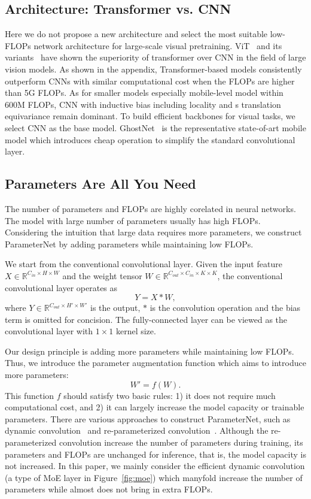 \documentclass[10pt,twocolumn,letterpaper]{article}
\begin{document}
\subsection{Architecture: Transformer vs. CNN}
Here we do not propose a new architecture and select the most suitable low-FLOPs network architecture for large-scale visual pretraining.
ViT~\cite{vit} and its variants~\cite{swin,tnt,pvt} have shown the superiority of transformer over CNN in the field of large vision models. As shown in the appendix, Transformer-based models consistently outperform CNNs with similar computational cost when the FLOPs are higher than 5G FLOPs. As for smaller models especially mobile-level model within 600M FLOPs, CNN with inductive bias including locality and s translation equivariance remain dominant. To build efficient backbones for visual tasks, we select CNN as the base model. GhostNet~\cite{ghostnet} is the representative state-of-art mobile model which introduces cheap operation to simplify the standard convolutional layer. 


\subsection{Parameters Are All You Need}
The number of parameters and FLOPs are highly corelated in neural networks. The model with large number of parameters usually has high FLOPs. Considering the intuition that large data requires more parameters, we construct ParameterNet by adding parameters while maintaining low FLOPs.

We start from the conventional convolutional layer. Given the input feature $X\in\mathbb{R}^{C_{in}\times H\times W}$ and the weight tensor $W\in\mathbb{R}^{C_{out}\times C_{in}\times K\times K}$, the conventional convolutional layer operates as
\begin{equation}
	Y = X * W,
\end{equation}
where $Y\in\mathbb{R}^{C_{out}\times H'\times W'}$ is the output, $*$ is the convolution operation and the bias term is omitted for concision. The fully-connected layer can be viewed as the convolutional layer with $1\times1$ kernel size.

Our design principle is adding more parameters while maintaining low FLOPs. Thus, we introduce the parameter augmentation function which aims to introduce more parameters:
\begin{equation}
	W' = f(W).
\end{equation}
This function $f$ should satisfy two basic rules: 1) it does not require much computational cost, and 2) it can largely increase the model capacity or trainable parameters.
There are various approaches to construct ParameterNet, such as dynamic convolution~\cite{dynamic-conv} and re-parameterized convolution~\cite{repvgg}. Although the re-parameterized convolution increase the number of parameters during training, its parameters and FLOPs are unchanged for inference, that is, the model capacity is not increased. In this paper, we mainly consider the efficient dynamic convolution (a type of MoE layer in Figure~\ref{fig:moe}) which manyfold increase the number of parameters while almost does not bring in extra FLOPs. 
\end{document}
